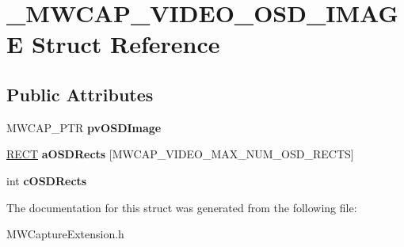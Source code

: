 \hypertarget{struct__MWCAP__VIDEO__OSD__IMAGE}{\section{\-\_\-\-M\-W\-C\-A\-P\-\_\-\-V\-I\-D\-E\-O\-\_\-\-O\-S\-D\-\_\-\-I\-M\-A\-G\-E Struct Reference}
\label{struct__MWCAP__VIDEO__OSD__IMAGE}
}
\subsection*{Public Attributes}
\begin{DoxyCompactItemize}
\item 
\hypertarget{struct__MWCAP__VIDEO__OSD__IMAGE_a3506e5def7473ba76921b2614f140e75}{M\-W\-C\-A\-P\-\_\-\-P\-T\-R {\bfseries pv\-O\-S\-D\-Image}}\label{struct__MWCAP__VIDEO__OSD__IMAGE_a3506e5def7473ba76921b2614f140e75}

\item 
\hypertarget{struct__MWCAP__VIDEO__OSD__IMAGE_adc014884c80757da4986586b40c9a980}{\hyperlink{struct__RECT}{R\-E\-C\-T} {\bfseries a\-O\-S\-D\-Rects} \mbox{[}M\-W\-C\-A\-P\-\_\-\-V\-I\-D\-E\-O\-\_\-\-M\-A\-X\-\_\-\-N\-U\-M\-\_\-\-O\-S\-D\-\_\-\-R\-E\-C\-T\-S\mbox{]}}\label{struct__MWCAP__VIDEO__OSD__IMAGE_adc014884c80757da4986586b40c9a980}

\item 
\hypertarget{struct__MWCAP__VIDEO__OSD__IMAGE_afee685ce45430a68782e1ebbeacb3553}{int {\bfseries c\-O\-S\-D\-Rects}}\label{struct__MWCAP__VIDEO__OSD__IMAGE_afee685ce45430a68782e1ebbeacb3553}

\end{DoxyCompactItemize}


The documentation for this struct was generated from the following file\-:\begin{DoxyCompactItemize}
\item 
M\-W\-Capture\-Extension.\-h\end{DoxyCompactItemize}
